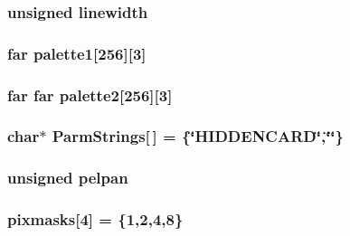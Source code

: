 \hypertarget{ID__VL_8C_a4290871866270ef6854fb238a3c8698d}{
\subsubsection[{linewidth}]{\setlength{\rightskip}{0pt plus 5cm}unsigned {\bf linewidth}}}
\label{ID__VL_8C_a4290871866270ef6854fb238a3c8698d}
\hypertarget{ID__VL_8C_a6b76f235786a33e3e5633337d4040a8e}{
\subsubsection[{palette1}]{ far {\bf palette1}\mbox{[}256\mbox{]}\mbox{[}3\mbox{]}}}
\label{ID__VL_8C_a6b76f235786a33e3e5633337d4040a8e}
\hypertarget{ID__VL_8C_ab69c3ce9f0621a6327c2be3696acb729}{
\subsubsection[{palette2}]{ far far {\bf palette2}\mbox{[}256\mbox{]}\mbox{[}3\mbox{]}}}
\label{ID__VL_8C_ab69c3ce9f0621a6327c2be3696acb729}
\hypertarget{ID__VL_8C_af8599e1c1fbb3afabbdaa22e7c4a94b0}{
\subsubsection[{ParmStrings}]{\setlength{\rightskip}{0pt plus 5cm}char$\ast$ {\bf ParmStrings}\mbox{[}$\,$\mbox{]} = \{\char`\"{}HIDDENCARD\char`\"{},\char`\"{}\char`\"{}\}}}
\label{ID__VL_8C_af8599e1c1fbb3afabbdaa22e7c4a94b0}
\hypertarget{ID__VL_8C_a868e53c86d5ef1ddae46b80290a36cd8}{
\subsubsection[{pelpan}]{\setlength{\rightskip}{0pt plus 5cm}unsigned {\bf pelpan}}}
\label{ID__VL_8C_a868e53c86d5ef1ddae46b80290a36cd8}
\hypertarget{ID__VL_8C_afff3c766a9857f86d033f67419f5db75}{
\subsubsection[{pixmasks}]{ {\bf pixmasks}\mbox{[}4\mbox{]} = \{1,2,4,8\}}}
